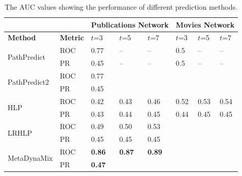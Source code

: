


\begin{table}[t]
\centering
\caption{The AUC values showing the performance of different prediction methods.}
\label{table_publications}\label{tbl:auc}
\begin{tabular}{ll|p{1cm}|p{1cm}|p{1cm}|p{1cm}|p{1cm}|p{1cm}|}
\cline{3-8}
                        &   & \multicolumn{3}{l|}{Publications Network} & \multicolumn{3}{l|}{Movies Network} \\ \hline
\multicolumn{1}{|l|}{\textbf{Method}} & \textbf{Metric} & $t$=3 & $t$=5  & $t$=7  & $t$=3  & $t$=5  & $t$=7     \\ \hline

\multicolumn{1}{|l|}{\multirow{2}{*}{PathPredict}}  & ROC  & 0.77 & -- & -- & 0.5 & -- & -- \\ \cline{2-8}
\multicolumn{1}{|l|}{}  & PR  & 0.45 & -- & -- & 0.5 & -- & -- \\ \hline

\multicolumn{1}{|l|}{\multirow{2}{*}{PathPredict2}}  & ROC  &  0.77  &           &           &         &         &         \\ \cline{2-8}
\multicolumn{1}{|l|}{}  & PR  &   0.45  &           &           &         &         &         \\ \hline

\multicolumn{1}{|l|}{\multirow{2}{*}{HLP}}  & ROC  &   0.42  &   0.43   &   0.46     &     0.52    &    0.53     &    0.54     \\ \cline{2-8}
\multicolumn{1}{|l|}{}  & PR  &    0.43  &   0.44   &   0.45    &   0.44   &  0.45   &  0.45  \\ \hline

\multicolumn{1}{|l|}{\multirow{2}{*}{LRHLP}}  & ROC  &   0.49   &   0.50   &   0.53    &         &         &         \\ \cline{2-8}
\multicolumn{1}{|l|}{}  & PR  &  0.45    &   0.45   &   0.45   &         &         &         \\ \hline

\multicolumn{1}{|l|}{\multirow{2}{*}{MetaDynaMix}}  & ROC  & \textbf{0.86} &  \textbf{0.87}  & \textbf{0.89}   &    &   &    \\ \cline{2-8}
\multicolumn{1}{|l|}{}  & PR  & \textbf{0.47} &    &    &    &    &    \\ \hline

\end{tabular}
\end{table}

